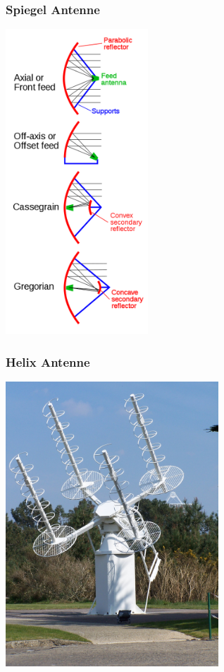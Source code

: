 \begin{frame}
  \frametitle{Spiegel Antenne}
  \begin{center}
    \includegraphics[width=0.4\textwidth]{a09/Parabolic_antenna_types.png}
    \tiny \hyperlink{refs}{\cite{wm}}
  \end{center}
\end{frame}


\begin{frame}
  \frametitle{Helix Antenne}
  \begin{center}
    \includegraphics[width=0.6\textwidth]{a09/Traqueur_acquisition.JPG}
    \tiny \hyperlink{refs}{\cite{wm}}
  \end{center}
\end{frame}

